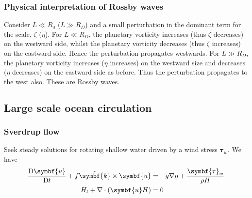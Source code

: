 \documentclass{jknotes}
\begin{document}
\subsubsection{Physical interpretation of Rossby waves}
Consider $L \ll R_d$ ($L \gg R_D$)  and a small perturbation in the dominant
term for the scale, $\zeta$ ($\eta$). For $L \ll R_D$, the planetary vorticity
increases (thus $\zeta$ decreases) on the westward side, whilst the planetary
vorticity decreases (thus $\zeta$ increases) on the eastward side. Hence the
perturbation propagates westwards. For $L \gg R_D$, the planetary vorticity
increases ($\eta$ increases) on the westward size and decreases ($\eta$
decreases) on the eastward side as before. Thus the perturbation propagates
to the west also. These are Rossby waves.
\begin{center}
	\qquad
\end{center}

\subsection{Large scale ocean circulation}
\subsubsection{Sverdrup flow}
Seek steady solutions for rotating shallow water driven by a wind stress
$\symbf{\tau}_w$. We have
\begin{align}
	\frac{\diffD \symbf{u}}{\diffD t} + f \hat{\symbf{k}}\times\symbf{u} &= -g \nabla \eta +
	\frac{\symbf{\tau}_w}{\rho H} \label{eq:lsoc1} \\
	H_t + \nabla \cdot (\symbf{u} H) &= 0 \label{eq:lsoc2}
\end{align}
\end{document}
